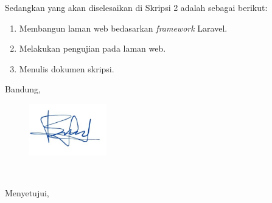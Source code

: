 \documentclass[a4paper,twoside]{article}
\begin{document}
Sedangkan yang akan diselesaikan di Skripsi 2 adalah sebagai berikut:
\begin{enumerate}
\item Membangun laman web bedasarkan \emph{framework} Laravel.
\item Melakukan pengujian pada laman web.
\item Menulis dokumen skripsi.
\end{enumerate}

\vspace{1cm}
\centering Bandung, \tanggal\\
\begin{figure}[h]
	\centering
	\includegraphics[width=0.3\textwidth]{tandatangan.jpg}
\end{figure}
\nama \\ 
\vspace{1cm}

Menyetujui, \\
\end{document}
